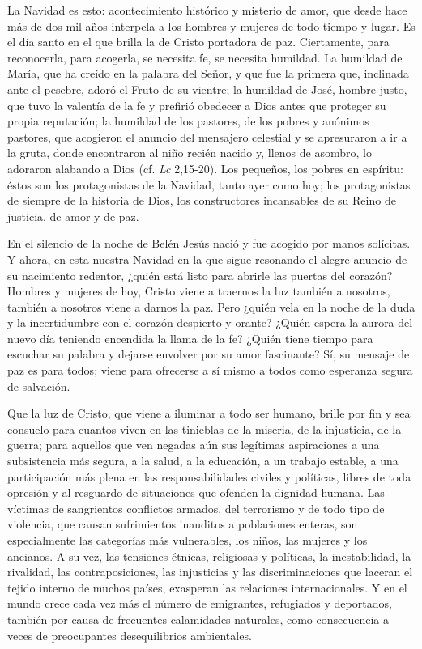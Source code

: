 La Navidad es esto: acontecimiento histórico y misterio de amor, que desde hace más de dos mil años interpela a los hombres y mujeres de todo tiempo y lugar. Es el día santo en el que brilla la  de Cristo portadora de paz. Ciertamente, para reconocerla, para acogerla, se necesita fe, se necesita humildad. La humildad de María, que ha creído en la palabra del Señor, y que fue la primera que, inclinada ante el pesebre, adoró el Fruto de su vientre; la humildad de José, hombre justo, que tuvo la valentía de la fe y prefirió obedecer a Dios antes que proteger su propia reputación; la humildad de los pastores, de los pobres y anónimos pastores, que acogieron el anuncio del mensajero celestial y se apresuraron a ir a la gruta, donde encontraron al niño recién nacido y, llenos de asombro, lo adoraron alabando a Dios (cf. \emph{Lc} 2,15-20). Los pequeños, los pobres en espíritu: éstos son los protagonistas de la Navidad, tanto ayer como hoy; los protagonistas de siempre de la historia de Dios, los constructores incansables de su Reino de justicia, de amor y de paz.

En el silencio de la noche de Belén Jesús nació y fue acogido por manos solícitas. Y ahora, en esta nuestra Navidad en la que sigue resonando el alegre anuncio de su nacimiento redentor, ¿quién está listo para abrirle las puertas del corazón? Hombres y mujeres de hoy, Cristo viene a traernos la luz también a nosotros, también a nosotros viene a darnos la paz. Pero ¿quién vela en la noche de la duda y la incertidumbre con el corazón despierto y orante? ¿Quién espera la aurora del nuevo día teniendo encendida la llama de la fe? ¿Quién tiene tiempo para escuchar su palabra y dejarse envolver por su amor fascinante? Sí, su mensaje de paz es para todos; viene para ofrecerse a sí mismo a todos como esperanza segura de salvación.

Que la luz de Cristo, que viene a iluminar a todo ser humano, brille por fin y sea consuelo para cuantos viven en las tinieblas de la miseria, de la injusticia, de la guerra; para aquellos que ven negadas aún sus legítimas aspiraciones a una subsistencia más segura, a la salud, a la educación, a un trabajo estable, a una participación más plena en las responsabilidades civiles y políticas, libres de toda opresión y al resguardo de situaciones que ofenden la dignidad humana. Las víctimas de sangrientos conflictos armados, del terrorismo y de todo tipo de violencia, que causan sufrimientos inauditos a poblaciones enteras, son especialmente las categorías más vulnerables, los niños, las mujeres y los ancianos. A su vez, las tensiones étnicas, religiosas y políticas, la inestabilidad, la rivalidad, las contraposiciones, las injusticias y las discriminaciones que laceran el tejido interno de muchos países, exasperan las relaciones internacionales. Y en el mundo crece cada vez más el número de emigrantes, refugiados y deportados, también por causa de frecuentes calamidades naturales, como consecuencia a veces de preocupantes desequilibrios ambientales.

